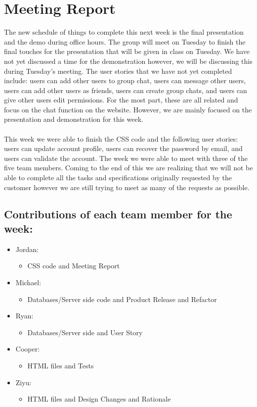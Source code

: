 \documentclass[a4paper]{article}
\begin{document}
\section{Meeting Report}
The new schedule of things to complete this next week is the final presentation and the demo during office hours. The group will meet on Tuesday to finish the final touches for the presentation that will be given in class on Tuesday. We have not yet discussed a time for the demonstration however, we will be discussing this during Tuesday's meeting. The user stories that we have not yet completed include: users can add other users to group chat, users can message other users, users can add other users as friends, users can create group chats, and users can give other users edit permissions. For the most part, these are all related and focus on the chat function on the website. However, we are mainly focused on the presentation and demonstration for this week. \\
\\
This week we were able to finish the CSS code and the following user stories: users can update account profile, users can recover the password by email, and users can validate the account. The week we were able to meet with three of the five team members. Coming to the end of this we are realizing that we will not be able to complete all the tasks and specifications originally requested by the customer however we are still trying to meet as many of the requests as possible.

\subsection{Contributions of each team member for the week:}
\begin{itemize}
\item Jordan: 
\begin{itemize}
\item CSS code and Meeting Report
\end{itemize}

\item Michael: 
\begin{itemize}
\item Databases/Server side code and Product Release and Refactor
\end{itemize}

\item Ryan: 
\begin{itemize}
\item Databases/Server side and User Story
\end{itemize}

\item Cooper: 
\begin{itemize}
\item HTML files and Tests
\end{itemize}

\item Ziyu: 
\begin{itemize}
\item HTML files and Design Changes and Rationale 
\end{itemize}

\end{itemize}
\end{document}
